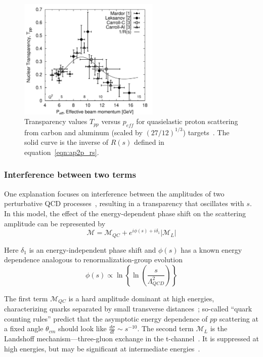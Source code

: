 \begin{figure}[!h]
    \centering
    \includegraphics[width=0.6\textwidth]{chap2/ap2p.pdf}
    \caption{Transparency values $T_{pp}$ versus $p_{eff}$ for quasielastic
             proton scattering from carbon and aluminum (scaled by
             $(27/12)^{1/3}$) targets~\cite{Aclander_2004}.
             The solid curve is the inverse of $R(s)$ defined in
             equation~\ref{eqn:ap2p_rs}.
            }
    \label{fig:ap2p}
\end{figure}

\subsubsection{Interference between two terms}
One explanation focuses on interference between the amplitudes of two
perturbative QCD processes~\cite{Ralston_1988}, resulting in a transparency
that oscillates with $s$.
In this model, the effect of the energy-dependent phase shift on the scattering amplitude can be represented by
\begin{equation}
    \mathcal{M} = \mathcal{M}_{QC} + e^{i\phi(s) + i \delta_1}\left|\mathcal{M}_L\right|
\end{equation}

Here $\delta_1$ is an energy-independent phase shift and $\phi(s)$ has a known
energy dependence analogous to renormalization-group
evolution~\cite{Pire_1982, Ralston_1982, Sen_1983}
\begin{equation}
    \phi(s) \propto \ln\left\{ \ln \left( \frac{s}{\Lambda_{QCD}^2} \right) \right\}
\end{equation}


The first term $\mathcal{M}_{QC}$ is a hard amplitude dominant at high energies,
characterizing quarks separated by small transverse
distances~\cite{Brodsky_1973, Brodsky_1975, Matveev_1973, Lepage_1980};
so-called ``quark counting rules'' predict that the asymptotic energy
dependence of $pp$ scattering at a fixed angle $\theta_{cm}$ should look like
$\frac{d\sigma}{dt}\sim s^{-10}$.
The second term $\mathcal{M}_L$ is the Landshoff mechanism---three-gluon exchange in the
t-channel~\cite{Landshoff_1974, Landshoff_1980}.
It is suppressed at high energies, but may be significant at intermediate
energies~\cite{Mueller_1981}.


